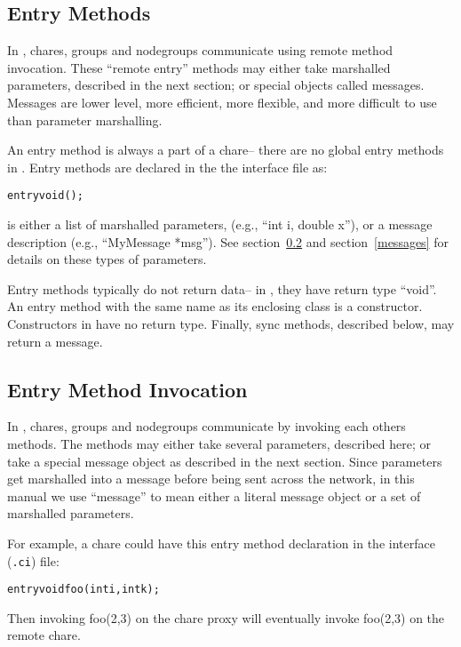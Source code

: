 \subsection{Entry Methods}

\label{entry}

In \charmpp, chares, groups and 
nodegroups communicate using remote method invocation.  These ``remote entry'' methods may either take marshalled parameters, described in the next section; or special objects called messages.  Messages are lower level, more efficient, more flexible, and more difficult to use than parameter marshalling.

An entry method is always a part of a chare--
there are no global entry methods in \charmpp{}.
Entry methods are declared in the the interface file as:

\begin{alltt}
entry void ();
\end{alltt}

 is either a list of marshalled parameters,
(e.g., ``int i, double x''), or a message description (e.g.,
``MyMessage *msg'').  See section~\ref{marshalling} and
section~\ref{messages} for details on these types of
parameters.

Entry methods typically do not return data-- in \CC, they have
return type ``void''.  An entry method with the same name
as its enclosing class is a constructor.  Constructors in \CC
have no return type.  Finally, sync methods, described below,
may return a message.

\subsection{Entry Method Invocation}

\label{marshalling}

In \charmpp, chares, groups and 
nodegroups communicate by invoking each others methods. 
The methods may either take several parameters, described here; 
or take a special message object as described in the next section.
Since parameters get marshalled into a message before being
sent across the network, in this manual we use ``message''
to mean either a literal message object or a set of marshalled
parameters.

For example, a chare could have this entry method declaration in 
the interface ({\tt .ci}) file:
\begin{alltt}
  entry void foo(int i,int k);
\end{alltt}
Then invoking foo(2,3) on the chare proxy will eventually
invoke foo(2,3) on the remote chare.

